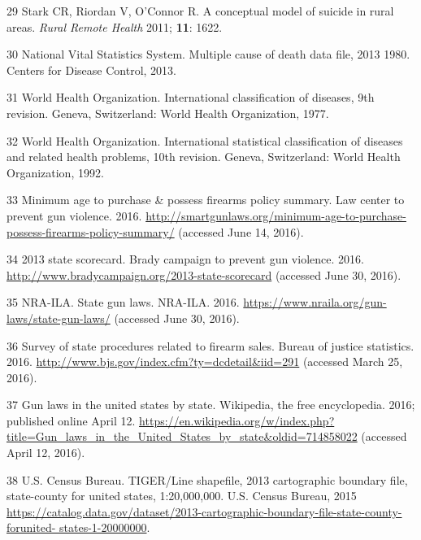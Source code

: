 \documentclass[]{article}
\begin{document}
\hypertarget{ref-starkux5fconceptualux5f2011}{}
29 Stark CR, Riordan V, O'Connor R. A conceptual model of suicide in
rural areas. \emph{Rural Remote Health} 2011; \textbf{11}: 1622.

\hypertarget{ref-nationalux5fvitalux5fstatisticsux5fsystemux5fmultipleux5f2013}{}
30 National Vital Statistics System. Multiple cause of death data file,
2013 1980. Centers for Disease Control, 2013.

\hypertarget{ref-worldux5fhealthux5forganizationux5finternationalux5f1977}{}
31 World Health Organization. International classification of diseases,
9th revision. Geneva, Switzerland: World Health Organization, 1977.

\hypertarget{ref-worldux5fhealthux5forganizationux5finternationalux5f1992}{}
32 World Health Organization. International statistical classification
of diseases and related health problems, 10th revision. Geneva,
Switzerland: World Health Organization, 1992.

\hypertarget{ref-ux5fminimumux5f2016}{}
33 Minimum age to purchase \& possess firearms policy summary. Law
center to prevent gun violence. 2016.
\url{http://smartgunlaws.org/minimum-age-to-purchase-possess-firearms-policy-summary/}
(accessed June 14, 2016).

\hypertarget{ref-ux5f2013ux5f2016}{}
34 2013 state scorecard. Brady campaign to prevent gun violence. 2016.
\url{http://www.bradycampaign.org/2013-state-scorecard} (accessed June
30, 2016).

\hypertarget{ref-nra-ilaux5fstateux5f2016}{}
35 NRA-ILA. State gun laws. NRA-ILA. 2016.
\url{https://www.nraila.org/gun-laws/state-gun-laws/} (accessed June 30,
2016).

\hypertarget{ref-ux5fsurveyux5f2016}{}
36 Survey of state procedures related to firearm sales. Bureau of
justice statistics. 2016.
\url{http://www.bjs.gov/index.cfm?ty=dcdetail\&iid=291} (accessed March
25, 2016).

\hypertarget{ref-ux5fgunux5f2016}{}
37 Gun laws in the united states by state. Wikipedia, the free
encyclopedia. 2016; published online April 12.
\url{https://en.wikipedia.org/w/index.php?title=Gun_laws_in_the_United_States_by_state\&oldid=714858022}
(accessed April 12, 2016).

\hypertarget{ref-u.s.ux5fcensusux5fbureauux5ftigerux2flineux5f2015}{}
38 U.S. Census Bureau. TIGER/Line shapefile, 2013 cartographic boundary
file, state-county for united states, 1:20,000,000. U.S. Census Bureau,
2015
\href{https://catalog.data.gov/dataset/2013-cartographic-boundary-file-state-county-forunited-\%20states-1-20000000}{https://catalog.data.gov/dataset/2013-cartographic-boundary-file-state-county-forunited- states-1-20000000}.
\end{document}
